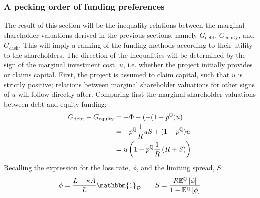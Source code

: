 \documentclass[../main.tex]{subfiles}
\begin{document}
    \subsubsection{A pecking order of funding preferences}
        The result of this section will be the inequality relations between the marginal shareholder valuations
        derived in the previous sections, namely $G_{\text{debt}}$, $G_{\text{equity}}$, and $G_{\text{cash}}$.
        This will imply a ranking of the funding methods according to their utility to the shareholders.
        The direction of the inequalities will be determined by the sign of the marginal investment cost, $u$,
        i.e. whether the project initially provides or claims capital. 
        First, the project is assumed to claim capital, such that $u$ is strictly positive;
        relations between marginal shareholder valuations for other signs of $u$ will follow directly after.
        Comparing first the marginal shareholder valuations between debt and equity funding:
            \begin{align}
                G_{\text{debt}}
                -
                G_{\text{equity}}
                &=
                    - \Phi 
                    - 
                    (
                        - (1 - p^{\mathbb{Q}})
                        u
                    )
                    \nonumber \\
                &= 
                    - p^{\mathbb{Q}}
                    \frac{1}{R}
                    u
                    S
                    +
                    (1 - p^{\mathbb{Q}})
                    u
                    \nonumber \\
                &=
                    u \left(
                        1
                        -
                        p^{\mathbb{Q}}
                        \frac{1}{R}
                        \left(
                            R
                            +
                            S
                        \right)
                    \right)
                \label{eqn:G-debt-vs-G-equity-step-1}
            \end{align}
        Recalling the expression for the loss rate, $\phi$, and the limiting spread, $S$:
            \begin{equation*}
                \phi 
                = 
                    \frac{
                        L - \kappa A
                    }{
                        L
                    } 
                    \mathbbm{1}_{\mathcal{D}}
                \qquad
                S 
                = 
                    \frac{
                        \grossrfrate
                        \mathbb{E}^{\rnmeasure}\left[\phi\right]
                    }{
                        1
                        -
                        \mathbb{E}^{\rnmeasure}\left[\phi\right]  
                    } 
            \end{equation*}
\end{document}
